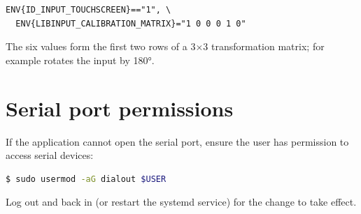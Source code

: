 \begin{lstlisting}
ENV{ID_INPUT_TOUCHSCREEN}=="1", \
  ENV{LIBINPUT_CALIBRATION_MATRIX}="1 0 0 0 1 0"
\end{lstlisting}

The six values form the first two rows of a 3$\times$3 transformation matrix;
for example \code{-1 0 1 0 -1 1} rotates the input by 180°.

\section{Serial port permissions}

If the application cannot open the serial port, ensure the user has permission to
access serial devices:

\begin{lstlisting}[language=bash]
$ sudo usermod -aG dialout $USER
\end{lstlisting}

Log out and back in (or restart the systemd service) for the change to take effect.
